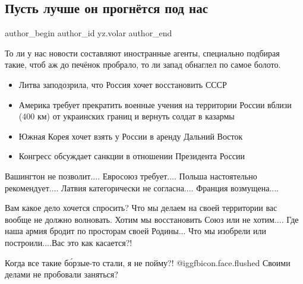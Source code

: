  
 
 
 
 
 
\subsection{Пусть лучше он прогнётся под нас}
\label{sec:13_01_2022.yz.volar.1.prognetsa_pod_nas}
 
\ifcmt
 author_begin
   author_id yz.volar
 author_end
\fi

То ли у нас новости составляют иностранные агенты, специально подбирая такие,
чтоб аж до печёнок пробрало, то ли запад обнаглел по самое болото.

\begin{itemize}
  \item Литва заподозрила, что Россия хочет восстановить СССР
  \item Америка требует прекратить военные учения на территории России вблизи (400 км) от украинских границ и вернуть солдат в казармы
  \item Южная Корея хочет взять у России в аренду Дальний Восток
  \item Конгресс обсуждает санкции в отношении Президента России
\end{itemize}

Вашингтон не позволит.... Евросоюз требует.... Польша настоятельно
рекомендует.... Латвия категорически не согласна.... Франция возмущена....


Вам какое дело хочется спросить? Что мы делаем на своей территории вас вообще
не должно волновать. Хотим мы восстановить Союз или не хотим.... Где наша армия
бродит по просторам своей Родины... Что мы изобрели или построили....Вас это
как касается?!

Когда все такие бо́рзые-то стали, я не пойму?!  @igg{fbicon.face.flushed}  Своими делами не пробовали
заняться?

